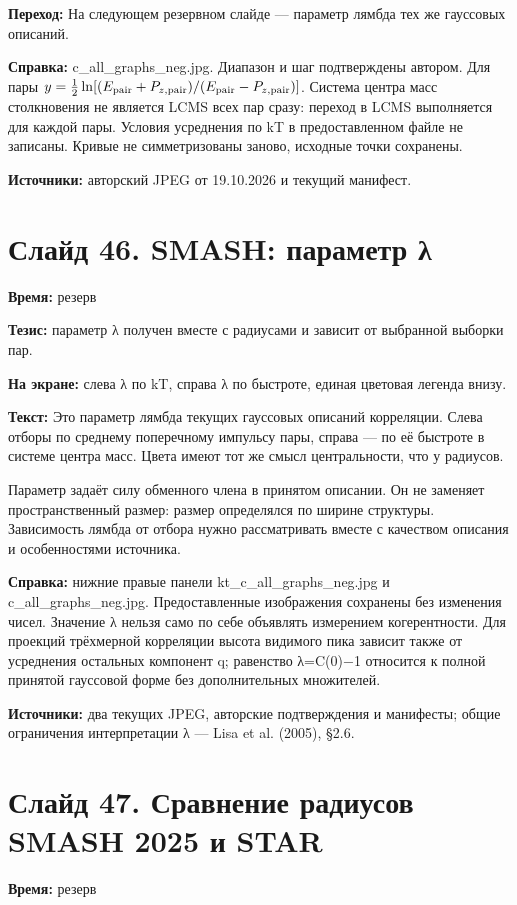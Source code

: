 \documentclass[11pt,a4paper]{article}
\begin{document}
\textbf{Переход:} На следующем резервном слайде — параметр лямбда тех же гауссовых описаний.

\textbf{Справка:} c\_all\_graphs\_neg.jpg. Диапазон и шаг подтверждены автором. Для пары \(y=\tfrac12\ln[(E_{\rm pair}+P_{z,\rm pair})/(E_{\rm pair}-P_{z,\rm pair})]\). Система центра масс столкновения не является LCMS всех пар сразу: переход в LCMS выполняется для каждой пары. Условия усреднения по kT в предоставленном файле не записаны. Кривые не симметризованы заново, исходные точки сохранены.

\textbf{Источники:} авторский JPEG от 19.10.2026 и текущий манифест.

\clearpage
\section*{Слайд 46. SMASH: параметр λ}
\textbf{Время:} резерв

\textbf{Тезис:} параметр λ получен вместе с радиусами и зависит от выбранной выборки пар.

\textbf{На экране:} слева λ по kT, справа λ по быстроте, единая цветовая легенда внизу.

\textbf{Текст:} Это параметр лямбда текущих гауссовых описаний корреляции. Слева отборы по среднему поперечному импульсу пары, справа — по её быстроте в системе центра масс. Цвета имеют тот же смысл центральности, что у радиусов.

Параметр задаёт силу обменного члена в принятом описании. Он не заменяет пространственный размер: размер определялся по ширине структуры. Зависимость лямбда от отбора нужно рассматривать вместе с качеством описания и особенностями источника.

\textbf{Справка:} нижние правые панели kt\_c\_all\_graphs\_neg.jpg и c\_all\_graphs\_neg.jpg. Предоставленные изображения сохранены без изменения чисел. Значение λ нельзя само по себе объявлять измерением когерентности. Для проекций трёхмерной корреляции высота видимого пика зависит также от усреднения остальных компонент q; равенство λ=C(0)−1 относится к полной принятой гауссовой форме без дополнительных множителей.

\textbf{Источники:} два текущих JPEG, авторские подтверждения и манифесты; общие ограничения интерпретации λ — Lisa et al. (2005), §2.6.

\clearpage
\section*{Слайд 47. Сравнение радиусов SMASH 2025 и STAR}
\textbf{Время:} резерв
\end{document}
